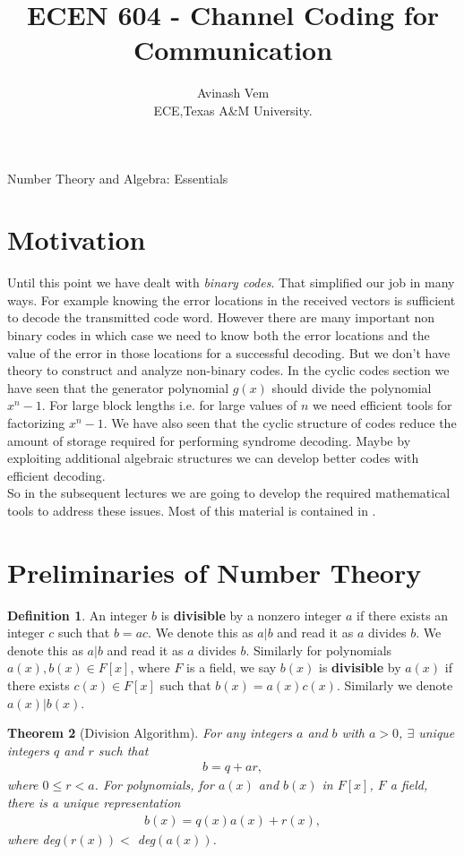 \documentclass[12pt]{article}
\title{ECEN 604 - Channel Coding for Communication}
\author{Avinash Vem\\
 ECE,Texas A\&M University.}
\newtheorem{thm}{Theorem}
\theoremstyle{definition}
\newtheorem{defn}[thm]{Definition}
\begin{document}
\maketitle

\begin{center}
{\Large Number Theory and Algebra: Essentials}
\end{center}


\section{Motivation}
Until this point we have dealt with \textit{binary codes}. That simplified our job in many ways. For example knowing the error locations in the received vectors is sufficient to decode the transmitted code word. However there are many important non binary codes in which case we need to know both the error locations and the value of the error in those locations for a successful decoding. But we don't have theory to construct and analyze non-binary codes. In the cyclic codes section we have seen that the generator polynomial $g(x)$ should divide the polynomial $x^n -1$. For large block lengths i.e. for large values of $n$ we need efficient tools for factorizing $x^n -1$. We have also seen that the cyclic structure of codes reduce the amount of storage required for performing syndrome decoding. Maybe by exploiting additional algebraic structures we can develop better codes with efficient decoding.\\

So in the subsequent lectures we are going to develop the required mathematical tools to address these issues. Most of this material is contained in \cite{Moon-ECCMAA05}.

\section{Preliminaries of Number Theory}
\begin{defn}
An integer $b$ is \textbf{divisible} by a nonzero integer $a$ if there exists an integer $c$ such that $b=ac$. We denote this as $a|b$ and read it as $a$ divides $b$.  We denote this as $a|b$ and read it as $a$ divides $b$. Similarly for polynomials $a(x), b(x)\in F[x]$, where $F$ is a field, we say $b(x)$ is \textbf{divisible} by $a(x)$ if there exists $c(x)\in F[x]$ such that $b(x)=a(x)c(x)$. Similarly we denote $a(x) | b(x)$.
\end{defn}

\begin{thm}[Division Algorithm]
For any integers $a$ and $b$ with $a>0$, $\exists$ unique integers $q$ and $r$ such that 
\begin{align*}
b=q+ar,
\end{align*} 
where $0\leq r < a$.
For polynomials, for $a(x)$ and $b(x)$ in $F[x]$, $F$ a field, there is a unique representation 
\begin{align*}
b(x)=q(x)a(x)+r(x),
\end{align*} 
where deg$(r(x))<$ deg$(a(x))$.
\end{thm}
\end{document}
